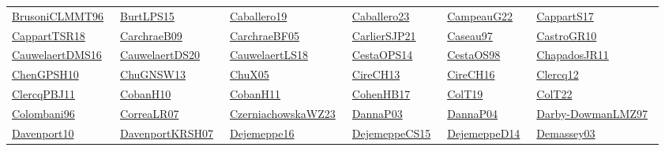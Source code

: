 \begin{longtable}{*{6}{l}}
\href{works/BrusoniCLMMT96.pdf}{BrusoniCLMMT96}~\cite{BrusoniCLMMT96} & \href{works/BurtLPS15.pdf}{BurtLPS15}~\cite{BurtLPS15} & \href{works/Caballero19.pdf}{Caballero19}~\cite{Caballero19} & \href{works/Caballero23.pdf}{Caballero23}~\cite{Caballero23} & \href{works/CampeauG22.pdf}{CampeauG22}~\cite{CampeauG22} & \href{works/CappartS17.pdf}{CappartS17}~\cite{CappartS17}\\ 
\href{works/CappartTSR18.pdf}{CappartTSR18}~\cite{CappartTSR18} & \href{works/CarchraeB09.pdf}{CarchraeB09}~\cite{CarchraeB09} & \href{works/CarchraeBF05.pdf}{CarchraeBF05}~\cite{CarchraeBF05} & \href{}{CarlierSJP21}~\cite{CarlierSJP21} & \href{works/Caseau97.pdf}{Caseau97}~\cite{Caseau97} & \href{}{CastroGR10}~\cite{CastroGR10}\\ 
\href{works/CauwelaertDMS16.pdf}{CauwelaertDMS16}~\cite{CauwelaertDMS16} & \href{works/CauwelaertDS20.pdf}{CauwelaertDS20}~\cite{CauwelaertDS20} & \href{works/CauwelaertLS18.pdf}{CauwelaertLS18}~\cite{CauwelaertLS18} & \href{}{CestaOPS14}~\cite{CestaOPS14} & \href{works/CestaOS98.pdf}{CestaOS98}~\cite{CestaOS98} & \href{works/ChapadosJR11.pdf}{ChapadosJR11}~\cite{ChapadosJR11}\\ 
\href{works/ChenGPSH10.pdf}{ChenGPSH10}~\cite{ChenGPSH10} & \href{works/ChuGNSW13.pdf}{ChuGNSW13}~\cite{ChuGNSW13} & \href{works/ChuX05.pdf}{ChuX05}~\cite{ChuX05} & \href{works/CireCH13.pdf}{CireCH13}~\cite{CireCH13} & \href{}{CireCH16}~\cite{CireCH16} & \href{works/Clercq12.pdf}{Clercq12}~\cite{Clercq12}\\ 
\href{works/ClercqPBJ11.pdf}{ClercqPBJ11}~\cite{ClercqPBJ11} & \href{works/CobanH10.pdf}{CobanH10}~\cite{CobanH10} & \href{works/CobanH11.pdf}{CobanH11}~\cite{CobanH11} & \href{works/CohenHB17.pdf}{CohenHB17}~\cite{CohenHB17} & \href{works/ColT19.pdf}{ColT19}~\cite{ColT19} & \href{works/ColT22.pdf}{ColT22}~\cite{ColT22}\\ 
\href{works/Colombani96.pdf}{Colombani96}~\cite{Colombani96} & \href{}{CorreaLR07}~\cite{CorreaLR07} & \href{works/CzerniachowskaWZ23.pdf}{CzerniachowskaWZ23}~\cite{CzerniachowskaWZ23} & \href{works/DannaP03.pdf}{DannaP03}~\cite{DannaP03} & \href{}{DannaP04}~\cite{DannaP04} & \href{works/Darby-DowmanLMZ97.pdf}{Darby-DowmanLMZ97}~\cite{Darby-DowmanLMZ97}\\ 
\href{works/Davenport10.pdf}{Davenport10}~\cite{Davenport10} & \href{works/DavenportKRSH07.pdf}{DavenportKRSH07}~\cite{DavenportKRSH07} & \href{works/Dejemeppe16.pdf}{Dejemeppe16}~\cite{Dejemeppe16} & \href{works/DejemeppeCS15.pdf}{DejemeppeCS15}~\cite{DejemeppeCS15} & \href{works/DejemeppeD14.pdf}{DejemeppeD14}~\cite{DejemeppeD14} & \href{works/Demassey03.pdf}{Demassey03}~\cite{Demassey03}\\ 

\end{longtable}
